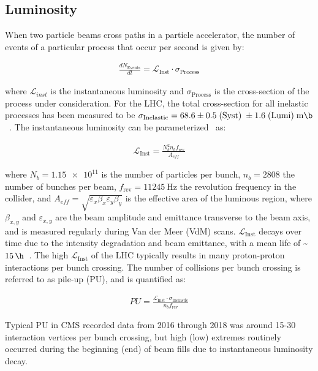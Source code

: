 \subsection{Luminosity}
When two particle beams cross paths in a particle accelerator, the number of events of a particular process that occur per second is given by:
\begin{linenomath*}
\begin{align}
{\frac{dN_{\text {Events}}}{dt}}= \mathcal{L}_{\text{Inst}} \cdot \sigma_{\text{Process}}
\end{align}
\end{linenomath*}
where $\mathcal{L}_{inst}$ is the instantaneous luminosity and $\sigma_{\text{Process}}$ is the cross-section of the process under consideration.
For the \beamenergy LHC, the total cross-section for all inelastic processes has been measured to be $\sigma_{\text{Inelastic}} = 68.6 \pm 0.5 \; (\text{Syst}) \; \pm 1.6 \; (\text{Lumi}) \; \si{\milli \b}$~\cite{inelasticprotonprotoncrosssection}.
The instantaneous luminosity can be parameterized~\cite{Karacheban:2294183} as:
\begin{linenomath*}
\begin{align}
\mathcal{L}_{\text{Inst}}=\frac{N_b^2 n_b f_{\mathrm{rev}}}{A_{eff}}
\end{align}
\end{linenomath*}
where $N_b = \num{1.15e11}$ is the number of particles per bunch, $n_b=2808$ the number of bunches per beam, $f_{\mathrm{rev}} = \SI{11245}{\Hz}$ the revolution frequency in the collider, and $A_{eff} = \sqrt{\varepsilon_x \beta_x \varepsilon_y \beta_y}$ is the effective area of the luminous region, where $\beta_{x,y}$ and $\varepsilon_{x,y}$ are the beam amplitude and emittance transverse to the beam axis, and is measured regularly during Van der Meer (VdM) scans.
$\mathcal{L}_{\text{Inst}}$ decays over time due to the intensity degradation and beam emittance, with a mean life of \sim$\SI{15}{\h}$~\cite{LyndonEvans_2008}.
The high $\mathcal{L}_{\text{Inst}}$ of the LHC typically results in many proton-proton interactions per bunch crossing.
The number of collisions per bunch crossing is referred to as pile-up (PU), and is quantified as:
\begin{linenomath*}
\begin{align}
PU = \frac{\mathcal{L}_{\text{Inst}} \cdot \sigma_{\text{Inelastic}}}{n_b f_{\mathrm{rev}}}
\end{align}
\end{linenomath*}
Typical PU in CMS recorded data from 2016 through 2018 was around 15-30 interaction vertices per bunch crossing, but high (low) extremes routinely occurred during the beginning (end) of beam fills due to instantaneous luminosity decay.
